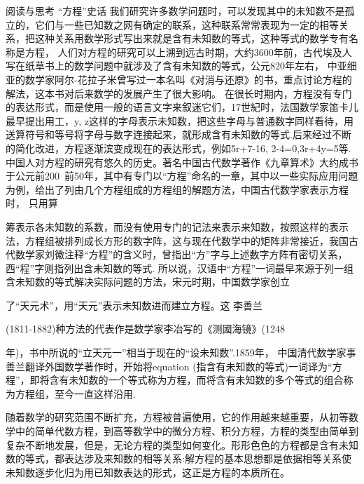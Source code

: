 \documentclass[11pt]{article}
\begin{document}
阅读与思考
“方程”史话
我们研究许多数学问题时，可以发现其中的未知数不是孤立的，它们与一些已知数之网有确定的联系，这种联系常常表现为一定的相等关系，把这种关系用数学形式写出来就是含有未知数的等式，这种等式的数学专有名称是方程，
人们对方程的研究可以上溯到远古时期，大约3600年前，古代埃及人写在纸草书上的数学问题中就涉及了含有未知数的等式，公元820年左右， 中亚细亚的数学家阿尔-花拉子米曾写过一本名叫《对消与还原》的书，重点讨论方程的解法，这本书对后来数学的发展产生了很大影响。
在很长时期内，方程没有专门的表达形式，而是使用一般的语言文字来叙迷它们，17世紀时，法国数学家笛卡儿最早提出用工，y, z这样的字母表示未知数，把这些字母与普通数字同样看待，用送算符号和等号将字母与数字连接起来，就形成含有未知数的等式.后来经过不断的简化改进，方程逐渐滨变成现在的表达形式，例如5r+7-16, 2-4=0,3r+4y=5等.
中国人对方程的研究有悠久的历史。著名中国古代数学著作《九章算术》大约成书于公元前200~前50年，其中有专门以“方程”命名的一章，其中以一些实际应用问题为例，给出了列由几个方程组成的方程组的解题方法，中国古代数学家表示方程时， 只用算

筹表示各未知数的系数，而没有使用专门的记法来表示来知数，按照这样的表示法，方程组被排列成长方形的数字阵，这与现在代数学中的矩阵非常接近，我国古代数学家刘徽注释“方程”的含义时，曾指出“方”字与上述数字方阵有密切关系，西“程”字则指列出含未知数的等式. 所以说，汉语中“方程”一词最早来源于列一组含未知数的等式解决实际问题的方法，宋元时期，中国数学家创立

了“天元术”，用“天元”表示未知数进而建立方程。这  李善兰

(1811-1882)种方法的代表作是数学家李冶写的《测國海镜》(1248

年)，书中所说的“立天元一”相当于现在的“设未知数”.1859年， 中国清代数学家事善兰翻译外国数学著作时，开始将equation (指含有未知数的等式)一词译为“方程”，即将含有未知数的一个等式称为方程，而将含有未知数的多个等式的组合称为方程组，至今一直这样沿用.

随着数学的研究范围不断扩充，方程被普遍使用，它的作用越来越重要，从初等数学中的简单代数方程，到高等数学中的微分方程、积分方程，方程的类型由简单到复杂不断地发展，但是，无论方程的类型如何变化。形形色色的方程都是含有未知数的等式，都表达涉及来知数的相等关系:解方程的基本思想都是依据相等关系使未知数逐步化归为用已知数表达的形式，这正是方程的本质所在。
\end{document}
